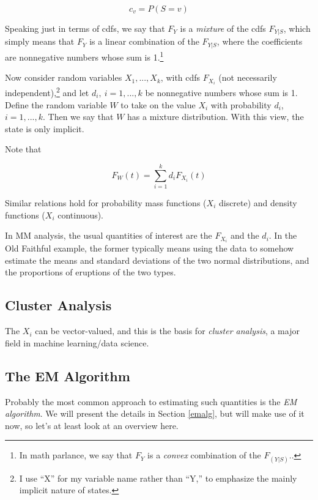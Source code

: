 \documentclass[11pt]{article}
\begin{document}
\begin{equation}
c_v = P(S = v)
\end{equation}

Speaking just in terms of cdfs, we say that $F_Y$ is a \textit{mixture}
of the cdfs $F_{Y|S}$, which simply means that $F_Y$ is a linear
combination of the $F_{Y|S}$, where the coefficients are nonnegative
numbers whose sum is 1.\footnote{In math parlance, we say that $F_Y$ is
a \textit{convex} combination of the $F_{(Y|S)}$..}

Now consider random variables $X_1,...,X_k$, with cdfs $F_{X_i}$ (not
necessarily independent),\footnote{I use ``X'' for my variable name
rather than ``Y,'' to emphasize the mainly implicit nature of states.}
and let $d_i, ~ i=1,...,k$ be nonnegative
numbers whose sum is 1.  Define the random variable $W$ to take on the
value $X_i$ with probability $d_i$, $i=1,...,k$.  Then we say that $W$
has a mixture distribution.  With this view, the state is only implicit.

Note that

\begin{equation}
F_{W}(t) = \sum_{i=1}^k d_i F_{X_i}(t)
\end{equation}

Similar relations hold for probability mass functions ($X_i$ discrete)
and density functions ($X_i$ continuous).

In MM analysis, the usual quantities of interest are the 
$F_{X_i}$ and the $d_i$.  In the Old Faithful example, the former 
typically means using the data to somehow estimate the means and
standard deviations of the two normal distributions, and the proportions
of eruptions of the two types.

\subsection{Cluster Analysis}

The $X_i$ can be vector-valued, and this is the basis for
\textit{cluster analysis}, a major field in machine learning/data
science.

\subsection{The EM Algorithm}

Probably the most common approach to estimating such quantities is the
\textit{EM algorithm}.  We will present the details in Section
\ref{emalg}, but will make use of it now, so let's at least look at an
overview here.
\end{document}
